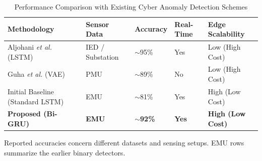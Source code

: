 \documentclass[conference,letterpaper]{IEEEtran}
\providecommand{\DIFaddbeginFL}{} %
\providecommand{\DIFaddendFL}{} %
\providecommand{\DIFdelbeginFL}{} %
\providecommand{\DIFdelendFL}{} %
\begin{document}
\begin{table}[!t]
\centering
\caption{Performance Comparison with Existing Cyber Anomaly Detection Schemes}
\label{tab:prior_work}
\small
\setlength{\tabcolsep}{2pt}
\DIFdelbeginFL %
\DIFdelendFL \DIFaddbeginFL \begin{tabular}{@{}>{\raggedright\arraybackslash}p{.245\linewidth}>{\centering\arraybackslash}p{.17\linewidth}>{\centering\arraybackslash}p{.15\linewidth}>{\centering\arraybackslash}p{.115\linewidth}>{\centering\arraybackslash}p{.20\linewidth}@{}}
\toprule
\DIFaddendFL \textbf{Methodology} & \textbf{Sensor Data} & \textbf{Accuracy} & \textbf{Real-Time} & \textbf{Edge Scalability} \\
\DIFdelbeginFL %
\DIFdelendFL \DIFaddbeginFL \midrule
\DIFaddendFL Aljohani \textit{et al.} \cite{aljohani2024} (LSTM) & IED / Substation & $\sim$95\% & Yes & Low (High Cost) \\
\DIFdelbeginFL %
\DIFdelendFL \DIFaddbeginFL

\DIFaddendFL Guha \textit{et al.} \cite{guha} (VAE) & PMU & $\sim$89\% & No & Low (High Cost) \\
\DIFdelbeginFL %
\DIFdelendFL \DIFaddbeginFL

\DIFaddendFL Initial Baseline (Standard LSTM) & EMU & $\sim$81\% & Yes & High (Low Cost) \\
\DIFdelbeginFL %
\DIFdelendFL \DIFaddbeginFL

\DIFaddendFL \textbf{Proposed (Bi-GRU)} & \textbf{EMU} & \textbf{$\sim$92\%} & \textbf{Yes} & \textbf{High (Low Cost)} \\
\DIFdelbeginFL %
\DIFdelendFL \DIFaddbeginFL \bottomrule
\DIFaddendFL \end{tabular}
\par\vspace{2pt}
\begin{minipage}{\linewidth}\footnotesize Reported accuracies concern different datasets and sensing setups. EMU rows summarize the earlier binary detectors.\end{minipage}
\end{table}
\end{document}
